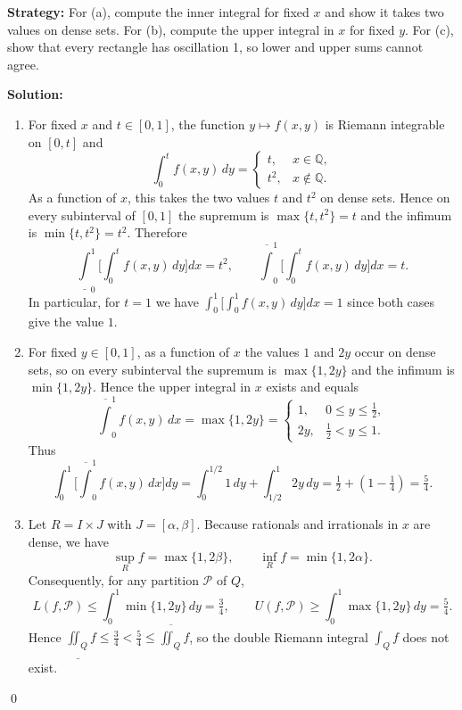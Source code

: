 \noindent\textbf{Strategy:} For (a), compute the inner integral for fixed $x$ and show it takes two values on dense sets. For (b), compute the upper integral in $x$ for fixed $y$. For (c), show that every rectangle has oscillation 1, so lower and upper sums cannot agree.

\bigskip\noindent\textbf{Solution:}
\begin{enumerate}[label=(\alph*)]
\item For fixed $x$ and $t\in[0,1]$, the function $y\mapsto f(x,y)$ is Riemann integrable on $[0,t]$ and
\[\int_0^t f(x,y)\,dy = \begin{cases} t, & x\in\mathbb Q, \\[4pt] t^2, & x\notin\mathbb Q.\end{cases}\]
As a function of $x$, this takes the two values $t$ and $t^2$ on dense sets. Hence on every subinterval of $[0,1]$ the supremum is $\max\{t,t^2\}=t$ and the infimum is $\min\{t,t^2\}=t^2$. Therefore
\[ \underline\int_0^1\!\Big[\int_0^t f(x,y)\,dy\Big]dx = t^2,\qquad \overline\int_0^1\!\Big[\int_0^t f(x,y)\,dy\Big]dx = t. \]
In particular, for $t=1$ we have $\int_0^1\!\big[\int_0^1 f(x,y)\,dy\big]dx=1$ since both cases give the value $1$.

\item For fixed $y\in[0,1]$, as a function of $x$ the values $1$ and $2y$ occur on dense sets, so on every subinterval the supremum is $\max\{1,2y\}$ and the infimum is $\min\{1,2y\}$. Hence the upper integral in $x$ exists and equals
\[ \overline\int_0^1 f(x,y)\,dx = \max\{1,2y\} = \begin{cases} 1, & 0\le y\le \tfrac12, \\[4pt] 2y, & \tfrac12< y\le 1. \end{cases} \]
Thus
\[ \int_0^1\!\Big[\overline\int_0^1 f(x,y)\,dx\Big]dy = \int_0^{1/2}\!1\,dy + \int_{1/2}^1\!2y\,dy = \tfrac12 + (1-\tfrac14) = \tfrac{5}{4}. \]

\item Let $R=I\times J$ with $J=[\alpha,\beta]$. Because rationals and irrationals in $x$ are dense, we have
\[ \sup_R f = \max\{1,2\beta\},\qquad \inf_R f=\min\{1,2\alpha\}. \]
Consequently, for any partition $\mathcal P$ of $Q$,
\[ L(f,\mathcal P) \le \int_0^1 \min\{1,2y\}\,dy = \tfrac{3}{4},\qquad U(f,\mathcal P) \ge \int_0^1 \max\{1,2y\}\,dy = \tfrac{5}{4}. \]
Hence $\underline{\iint_Q} f \le \tfrac34 < \tfrac54 \le \overline{\iint_Q} f$, so the double Riemann integral $\int_Q f$ does not exist.
\end{enumerate}\qed


